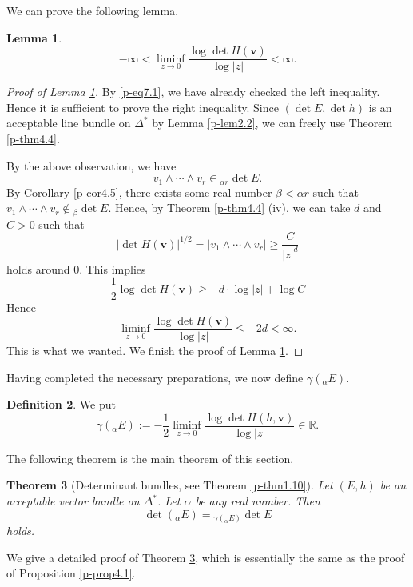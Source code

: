 \documentclass[12pt,twoside]{amsart}
\newtheorem{thm}{Theorem}[section]
\newtheorem{lem}[thm]{Lemma}
\theoremstyle{definition}
\newtheorem{defn}[thm]{Definition}
\begin{document}
We can prove the following lemma. 

\begin{lem}\label{p-lem7.3}
\[
-\infty<\liminf _{z\to 0} \frac{\log \det H(\bm v)}{\log |z|}<\infty. 
\]
\end{lem}
\begin{proof}[Proof of Lemma \ref{p-lem7.3}]
By \eqref{p-eq7.1}, we have already checked the left inequality. 
Hence it is sufficient to 
prove the right inequality. 
Since $(\det E, \det h)$ is an acceptable line bundle on $\Delta^*$ by 
Lemma \ref{p-lem2.2}, 
we can freely use Theorem \ref{p-thm4.4}. 

By the above observation, we have 
\[
v_1\wedge \cdots \wedge v_r\in {}_{\alpha r} \det E.  
\] 
By Corollary \ref{p-cor4.5}, 
there exists some real number $\beta<\alpha r$ 
such that 
$v_1\wedge \cdots \wedge v_r\not\in {}_\beta \det E$. 
Hence, by Theorem \ref{p-thm4.4} (iv), we can take $d$ and $C>0$ such that 
\[
|\det H(\bm v)|^{1/2} =|v_1\wedge \cdots \wedge v_r| \geq 
\frac{C}{|z|^d} 
\] 
holds around $0$. 
This implies 
\[
\frac{1}{2} \log \det H(\bm v) \geq  -d\cdot  \log |z| +\log C
\] 
Hence 
\[
\liminf _{z\to 0} \frac{\log \det H(\bm v)}{\log |z|} \leq -2 d<\infty. 
\] 
This is what we wanted. We finish the proof of Lemma \ref{p-lem7.3}. 
\end{proof}

Having completed the necessary preparations, we now define $\gamma({}_\alpha E)$.

\begin{defn}\label{p-def7.4}
We put 
\[
\gamma ({}_\alpha E):=-\frac{1}{2} \liminf_{z\to 0} 
\frac{\log\det H(h, \bm v)}{\log |z|} 
\in \mathbb R. 
\]
\end{defn}

The following theorem is the main theorem of this section. 

\begin{thm}[Determinant bundles, see Theorem \ref{p-thm1.10}]\label{p-thm7.5}
Let $(E, h)$ be an acceptable vector bundle on $\Delta^*$. 
Let $\alpha$ be any real number. 
Then 
\[
\det ({}_\alpha E)={}_{\gamma ({}_\alpha E)} \det E
\] 
holds. 
\end{thm}

We give a detailed proof of Theorem \ref{p-thm7.5}, 
which is essentially the same as the proof of Proposition 
\ref{p-prop4.1}. 
\end{document}
